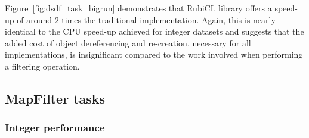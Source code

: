Figure~\ref{fig:dsdf_task_bigrun} demonstrates that RubiCL library offers a speed-up of around $2$ times the traditional implementation. Again, this is nearly identical to the \ac{CPU} speed-up achieved for integer datasets and suggests that the added cost of object dereferencing and re-creation, necessary for all implementations, is insignificant compared to the work involved when performing a filtering operation.



\subsection{MapFilter tasks}
\subsubsection{Integer performance}
